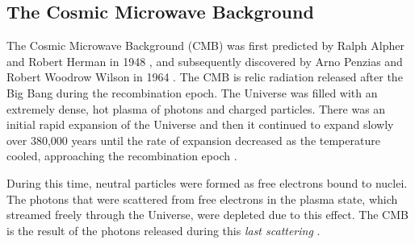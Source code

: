 \subsection{The Cosmic Microwave Background}\label{sec:DMOverview/CMB}
The Cosmic Microwave Background (CMB) was first predicted by Ralph Alpher and Robert Herman in 1948 \cite{CMBprediction}, and subsequently discovered by Arno Penzias and Robert Woodrow Wilson in 1964 \cite{CMBDisco}. The CMB is relic radiation released after the Big Bang during the recombination epoch. The Universe was filled with an extremely dense, hot plasma of photons and charged particles. There was an initial rapid expansion of the Universe and then it continued to expand slowly over 380,000 years until the rate of expansion decreased as the temperature cooled, approaching the recombination epoch \cite{DMPrimer}. 

During this time, neutral particles were formed as free electrons bound to nuclei. The photons that were scattered from free electrons in the plasma state, which streamed freely through the Universe, were depleted due to this effect. The CMB is the result of the photons released during this \textit{last scattering} \cite{Cirelli:2024ssz}.

